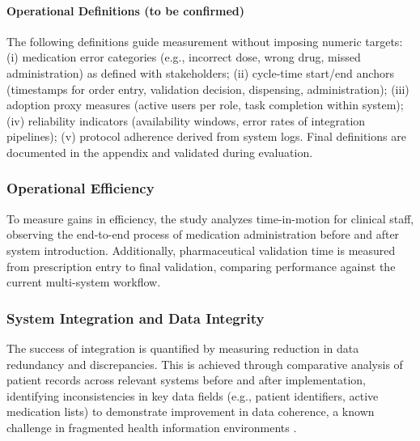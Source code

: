 \paragraph{Operational Definitions (to be confirmed)} The following definitions guide measurement without imposing numeric targets: (i) medication error categories (e.g., incorrect dose, wrong drug, missed administration) as defined with stakeholders; (ii) cycle-time start/end anchors (timestamps for order entry, validation decision, dispensing, administration); (iii) adoption proxy measures (active users per role, task completion within system); (iv) reliability indicators (availability windows, error rates of integration pipelines); (v) protocol adherence derived from system logs. Final definitions are documented in the appendix and validated during evaluation.

\subsubsection{Operational Efficiency}
To measure gains in efficiency, the study analyzes time-in-motion for clinical staff, observing the end-to-end process of medication administration before and after system introduction. Additionally, pharmaceutical validation time is measured from prescription entry to final validation, comparing performance against the current multi-system workflow.

\subsubsection{System Integration and Data Integrity}
The success of integration is quantified by measuring reduction in data redundancy and discrepancies. This is achieved through comparative analysis of patient records across relevant systems before and after implementation, identifying inconsistencies in key data fields (e.g., patient identifiers, active medication lists) to demonstrate improvement in data coherence, a known challenge in fragmented health information environments \cite{pinto2016identification}. 